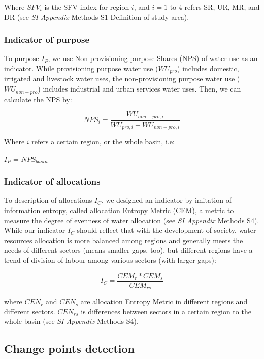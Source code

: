 \documentclass[9pt, twocolumn, twoside, lineno]{pnas-new}
\begin{document}
{	Where $SFV_i$ is the SFV-index for region $i$, and $i=1$ to $4$ refers SR, UR, MR, and DR (see \textit{SI Appendix} Methods S1 Definition of study area).

	\subsubsection*{Indicator of purpose}
	To purpose $I_P$, we use Non-provisioning purpose Shares (NPS) of water use as an indicator. While provisioning purpose water use ($WU_{pro}$) includes domestic, irrigated and livestock water uses, the non-provisioning purpose water use ($WU_{non-pro}$) includes industrial and urban services water uses. Then, we can calculate the NPS by:

	$$ NPS_{i} = \frac{WU_{non-pro, i}}{WU_{pro, i} + WU_{non-pro, i}} $$

	Where $i$ refers a certain region, or the whole basin, i.e:

	$I_P$ = $NPS_{basin}$

	\subsubsection*{Indicator of allocations}
	To description of allocations $I_C$, we designed an indicator by imitation of information entropy, called allocation Entropy Metric (CEM), a metric to measure the degree of evenness of water allocation (see \textit{SI Appendix} Methods S4).
	While our indicator $I_C$ should reflect that with the development of society, water resources allocation is more balanced among regions and generally meets the needs of different sectors (means smaller gaps, too), but different regions have a trend of division of labour among various sectors (with larger gaps):

	$$ I_C = \frac{CEM_{r}*CEM_{s}}{CEM_{rs}}$$
	
	where $CEN_{r}$ and $CEN_{s}$ are allocation Entropy Metric in different regions and different sectors. $CEN_{rs}$ is differences between sectors in a certain region to the whole basin (see \textit{SI Appendix} Methods S4). 

	\subsection*{Change points detection}

}
\end{document}
